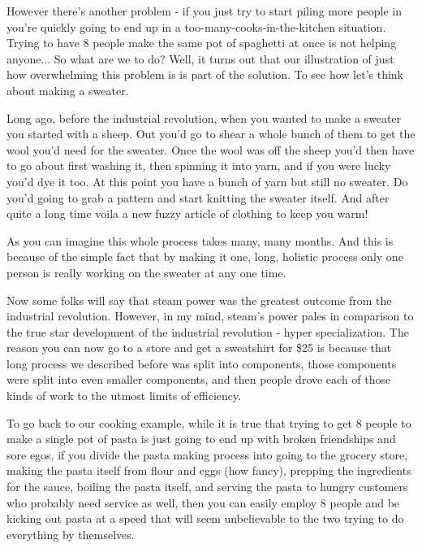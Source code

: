 \documentclass[11pt,a5paper]{book}
\begin{document}
However there's another problem - if you just try to start piling more people in you're quickly going to end up in a too-many-cooks-in-the-kitchen situation. Trying to have 8 people make the same pot of spaghetti at once is not helping anyone... So what are we to do? Well, it turns out that our illustration of just how overwhelming this problem is is part of the solution. To see how let's think about making a sweater.
\newline

Long ago, before the industrial revolution, when you wanted to make a sweater you started with a sheep. Out you'd go to shear a whole bunch of them to get the wool you'd need for the sweater. Once the wool was off the sheep you'd then have to go about first washing it, then spinning it into yarn, and if you were lucky you'd dye it too. At this point you have a bunch of yarn but still no sweater. Do you'd going to grab a pattern and start knitting the sweater itself. And after quite a long time voila a new fuzzy article of clothing to keep you warm! 
\newline

As you can imagine this whole process takes many, many months. And this is because of the simple fact that by making it one, long, holistic process only one person is really working on the sweater at any one time. 
\newline

Now some folks will say that steam power was the greatest outcome from the industrial revolution. However, in my mind, steam's power pales in comparison to the true star development of the industrial revolution - hyper specialization. The reason you can now go to a store and get a sweatshirt for \$25 is because that long process we described before was split into components, those components were split into even smaller components, and then people drove each of those kinds of work to the utmost limits of efficiency.
\newline

To go back to our cooking example, while it is true that trying to get 8 people to make a single pot of pasta is just going to end up with broken friendships and sore egos, if you divide the pasta making process into going to the grocery store, making the pasta itself from flour and eggs (how fancy), prepping the ingredients for the sauce, boiling the pasta itself, and serving the pasta to hungry customers who probably need service as well, then you can easily employ 8 people and be kicking out pasta at a speed that will seem unbelievable to the two trying to do everything by themselves. 
\newline
\end{document}
